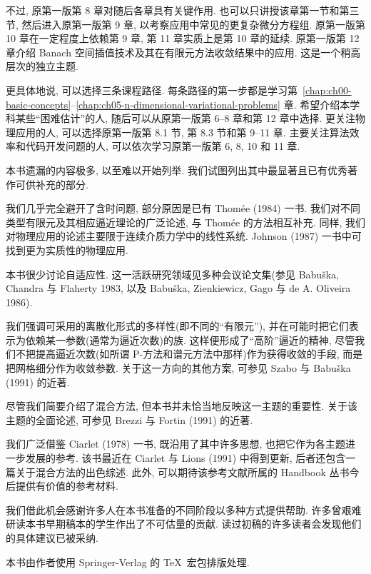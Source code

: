 不过, 原第一版第 8 章对随后各章具有关键作用. 也可以只讲授该章第一节和第三节, 然后进入原第一版第 9 章, 以考察应用中常见的更复杂微分方程组. 原第一版第 10 章在一定程度上依赖第 9 章, 第 11 章实质上是第 10 章的延续. 原第一版第 12 章介绍 Banach 空间插值技术及其在有限元方法收敛结果中的应用. 这是一个稍高层次的独立主题.

更具体地说, 可以选择三条课程路径. 每条路径的第一步都是学习第~\ref{chap:ch00-basic-concepts}--\ref{chap:ch05-n-dimensional-variational-problems} 章. 希望介绍本学科某些``困难估计''的人, 随后可以从原第一版第 6--8 章和第 12 章中选择. 更关注物理应用的人, 可以选择原第一版第 8.1 节, 第 8.3 节和第 9--11 章. 主要关注算法效率和代码开发问题的人, 可以依次学习原第一版第 6, 8, 10 和 11 章.

本书遗漏的内容极多, 以至难以开始列举. 我们试图列出其中最显著且已有优秀著作可供补充的部分.

我们几乎完全避开了含时问题, 部分原因是已有 Thomée (1984) 一书. 我们对不同类型有限元及其相应逼近理论的广泛论述, 与 Thomée 的方法相互补充. 同样, 我们对物理应用的论述主要限于连续介质力学中的线性系统. Johnson (1987) 一书中可找到更为实质性的物理应用.

本书很少讨论自适应性. 这一活跃研究领域见多种会议论文集(参见 Babuška, Chandra 与 Flaherty 1983, 以及 Babuška, Zienkiewicz, Gago 与 de A. Oliveira 1986).

我们强调可采用的离散化形式的多样性(即不同的``有限元''), 并在可能时把它们表示为依赖某一参数(通常为逼近次数)的族. 这样便形成了``高阶''逼近的精神, 尽管我们不把提高逼近次数(如所谓 P-方法和谱元方法中那样)作为获得收敛的手段, 而是把网格细分作为收敛参数. 关于这一方向的其他方案, 可参见 Szabo 与 Babuška (1991) 的近著.

尽管我们简要介绍了混合方法, 但本书并未恰当地反映这一主题的重要性. 关于该主题的全面论述, 可参见 Brezzi 与 Fortin (1991) 的近著.

我们广泛借鉴 Ciarlet (1978) 一书, 既沿用了其中许多思想, 也把它作为各主题进一步发展的参考. 该书最近在 Ciarlet 与 Lions (1991) 中得到更新, 后者还包含一篇关于混合方法的出色综述. 此外, 可以期待该参考文献所属的 Handbook 丛书今后提供有价值的参考材料.

我们借此机会感谢许多人在本书准备的不同阶段以多种方式提供帮助. 许多曾艰难研读本书早期稿本的学生作出了不可估量的贡献. 读过初稿的许多读者会发现他们的具体建议已被采纳.

本书由作者使用 Springer-Verlag 的 \TeX\ 宏包排版处理.

\clearpage
\tableofcontents
\clearpage
{}
